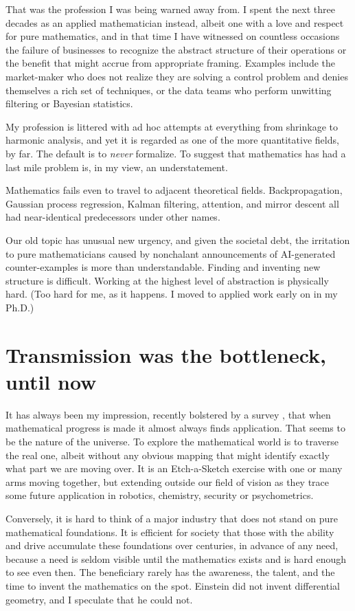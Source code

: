 \documentclass[11pt]{article}
\theoremstyle{definition}
\theoremstyle{remark}
\begin{document}
That was the profession I was being warned away from. I spent the next three decades as an applied mathematician instead, albeit one with a love and respect for pure mathematics, and in that time I have witnessed on countless occasions the failure of businesses to recognize the abstract structure of their operations or the benefit that might accrue from appropriate framing. Examples include the market-maker who does not realize they are solving a control problem and denies themselves a rich set of techniques, or the data teams who perform unwitting filtering or Bayesian statistics.

My profession is littered with ad hoc attempts at everything from shrinkage to harmonic analysis, and yet it is regarded as one of the more quantitative fields, by far. The default is to {\em never} formalize. To suggest that mathematics has had a last mile problem is, in my view, an understatement.

Mathematics fails even to travel to adjacent theoretical fields. Backpropagation, Gaussian process regression, Kalman filtering, attention, and mirror descent all had near-identical predecessors under other names.

Our old topic has unusual new urgency, and given the societal debt, the irritation to pure mathematicians caused by nonchalant announcements of AI-generated counter-examples is more than understandable. Finding and inventing new structure is difficult. Working at the highest level of abstraction is physically hard. (Too hard for me, as it happens. I moved to applied work early on in my Ph.D.)

\section{Transmission was the bottleneck, until now}

It has always been my impression, recently bolstered by a survey \citep{cotton2026pure}, that when mathematical progress is made it almost always finds application. That seems to be the nature of the universe. To explore the mathematical world is to traverse the real one, albeit without any obvious mapping that might identify exactly what part we are moving over. It is an Etch-a-Sketch exercise with one or many arms moving together, but extending outside our field of vision as they trace some future application in robotics, chemistry, security or psychometrics.

Conversely, it is hard to think of a major industry that does not stand on pure mathematical foundations. It is efficient for society that those with the ability and drive accumulate these foundations over centuries, in advance of any need, because a need is seldom visible until the mathematics exists and is hard enough to see even then. The beneficiary rarely has the awareness, the talent, and the time to invent the mathematics on the spot. Einstein did not invent differential geometry, and I speculate that he could not.
\end{document}
